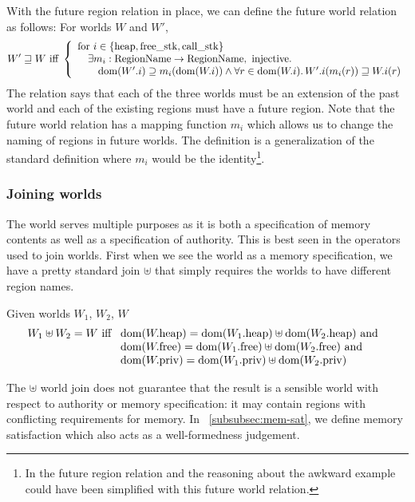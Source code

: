 \begin{jversion}
With the future region relation in place, we can define the future world relation as follows: For worlds $W$ and $W'$,
\[
  W' \future W \text{ iff } \left\{
    \array{l}
    \text{for $i \in \{\mathrm{heap},\mathrm{free\_stk},\mathrm{call\_stk} \}$} \\
    \quad\exists m_i : \RegionName \fun \RegionName, \text{ injective}\ldotp\\
    \qquad \dom(W'.i) \supseteq m_i(\dom(W.i)) \wedge \forall r \in \dom(W.i)\ldotp W'.i(m_i(r)) \future W.i(r)
     \endarray
  \right.
\]
The relation says that each of the three worlds must be an extension of the past world and each of the existing regions must have a future region.
Note that the future world relation has a mapping function $m_i$ which allows us to change the naming of regions in future worlds.
The definition is a generalization of the standard definition where $m_i$ would be the identity\footnote{In \citet{skorstengaard_reasoning_2017} the future region relation and the reasoning about the awkward example could have been simplified with this future world relation.}.

\subsubsection{Joining worlds}
\label{subsubsec:joining-worlds}
The world serves multiple purposes as it is both a specification of memory contents as well as a specification of authority.
This is best seen in the operators used to join worlds.
First when we see the world as a memory specification, we have a pretty standard join $\uplus$ that simply requires the worlds to have different region names.\begin{definition}
  Given worlds $W_1$, $W_2$, $W$
  \[
    W_1 \uplus W_2 = W
    \text{ iff }
    \begin{array}[t]{l}
      \dom(\pwheap) = \dom(\pwheap[W_1]) \uplus \dom(\pwheap[W_2]) \tand \\
      \dom(\pwfree) = \dom(\pwfree[W_1]) \uplus \dom(\pwfree[W_2]) \tand \\
      \dom(\pwpriv) = \dom(\pwpriv[W_1]) \uplus \dom(\pwpriv[W_2]) \\
    \end{array}
  \]
\end{definition}
The $\uplus$ world join does not guarantee that the result is a sensible world with respect to authority or memory specification: it may contain regions with conflicting requirements for memory.
In \sectionname~\ref{subsubsec:mem-sat}, we define memory satisfaction which also acts as a well-formedness judgement.


\end{jversion}
